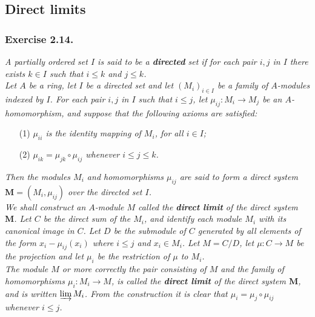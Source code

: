 \documentclass{article}
\begin{document}



\subsection*{Direct limits \\}



\subsubsection*{Exercise 2.14.}
\emph{A partially ordered set $I$ is said to be a \textbf{directed} set if
for each pair $i, j$ in $I$ there exists $k \in I$ such that $i \leq k$ and $j \leq k$.} \\

\emph{Let $A$ be a ring, let $I$ be a directed set and
let $(M_i)_{i \in I}$ be a family of $A$-modules indexed by $I$.
For each pair $i, j$ in $I$ such that $i \leq j$,
let $\mu_{ij}: M_i \to M_j$ be an $A$-homomorphism,
and suppose that the following axioms are satisfied:}
\begin{enumerate}
\item[(1)]
  \emph{$\mu_{ii}$ is the identity mapping of $M_i$, for all $i \in I$;}

\item[(2)]
  \emph{$\mu_{ik} = \mu_{jk} \circ \mu_{ij}$ whenever $i \leq j \leq k$.}
\end{enumerate}
\emph{Then the modules $M_i$ and homomorphisms $\mu_{ij}$ are said to
form a direct system $\mathbf{M} = (M_i, \mu_{ij})$ over the directed set $I$.} \\

\emph{We shall construct an $A$-module $M$ called the
\textbf{direct limit} of the direct system $\mathbf{M}$.
Let $C$ be the direct sum of the $M_i$,
and identify each module $M_i$ with its canonical image in $C$.
Let $D$ be the submodule of $C$ generated by all elements of the form
$x_i - \mu_{ij}(x_i)$ where $i \leq j$ and $x_i \in M_i$.
Let $M = C/D$,
let $\mu: C \to M$ be the projection
and let $\mu_i$ be the restriction of $\mu$ to $M_i$.} \\

\emph{The module $M$
or more correctly the pair consisting of $M$ and
the family of homomorphisms $\mu_i: M_i \to M$,
is called the \textbf{direct limit} of the direct system $\mathbf{M}$,
and is written $\varinjlim M_i$.
From the construction it is clear that $\mu_i = \mu_j \circ \mu_{ij}$ whenever $i \leq j$.} \\
\end{document}
